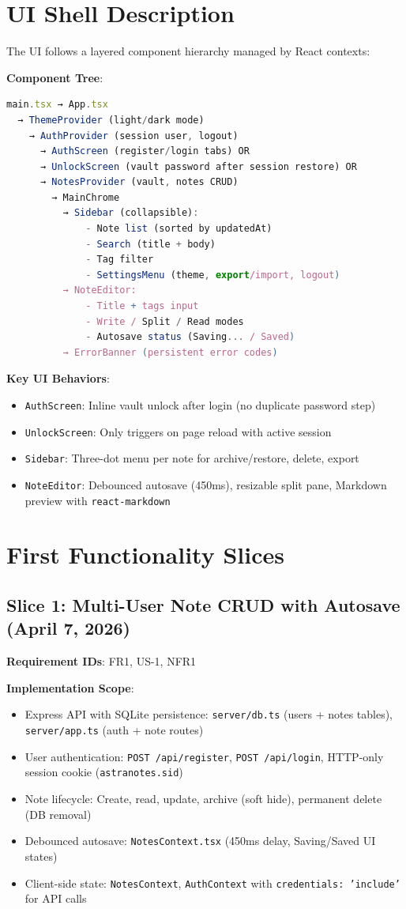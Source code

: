 \documentclass[11pt,a4paper]{article}
\begin{document}
\section{UI Shell Description}
The UI follows a layered component hierarchy managed by React contexts:

\textbf{Component Tree}:
\begin{lstlisting}[language=jsx]
main.tsx → App.tsx
  → ThemeProvider (light/dark mode)
    → AuthProvider (session user, logout)
      → AuthScreen (register/login tabs) OR
      → UnlockScreen (vault password after session restore) OR
      → NotesProvider (vault, notes CRUD)
        → MainChrome
          → Sidebar (collapsible):
              - Note list (sorted by updatedAt)
              - Search (title + body)
              - Tag filter
              - SettingsMenu (theme, export/import, logout)
          → NoteEditor:
              - Title + tags input
              - Write / Split / Read modes
              - Autosave status (Saving... / Saved)
          → ErrorBanner (persistent error codes)
\end{lstlisting}

\textbf{Key UI Behaviors}:
\begin{itemize}
  \item \texttt{AuthScreen}: Inline vault unlock after login (no duplicate password step)
  \item \texttt{UnlockScreen}: Only triggers on page reload with active session
  \item \texttt{Sidebar}: Three-dot menu per note for archive/restore, delete, export
  \item \texttt{NoteEditor}: Debounced autosave (450ms), resizable split pane, Markdown preview with \texttt{react-markdown}
\end{itemize}

\section{First Functionality Slices}
\subsection{Slice 1: Multi-User Note CRUD with Autosave (April 7, 2026)}
\textbf{Requirement IDs}: FR1, US-1, NFR1

\textbf{Implementation Scope}:
\begin{itemize}
  \item Express API with SQLite persistence: \texttt{server/db.ts} (users + notes tables), \texttt{server/app.ts} (auth + note routes)
  \item User authentication: \texttt{POST /api/register}, \texttt{POST /api/login}, HTTP-only session cookie (\texttt{astranotes.sid})
  \item Note lifecycle: Create, read, update, archive (soft hide), permanent delete (DB removal)
  \item Debounced autosave: \texttt{NotesContext.tsx} (450ms delay, Saving/Saved UI states)
  \item Client-side state: \texttt{NotesContext}, \texttt{AuthContext} with \texttt{credentials: 'include'} for API calls
\end{itemize}
\end{document}
